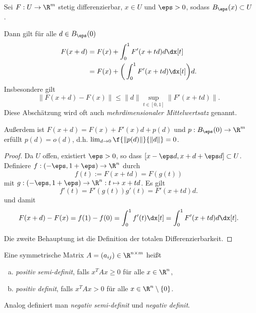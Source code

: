 \documentclass{mycourse}
\begin{document}
\begin{lem} \label{2.4}
	Sei $F: U \to \R^m$ stetig differenzierbar, $x\in U$ und $\eps > 0$, sodass $B_\eps(x) \subset U$.

	Dann gilt für alle $d \in B_\eps(0)$
	\begin{align*}
		F(x+d)
		&= F(x) + \int_0^1 F'(x+td) d \dx[t] \\
		&= F(x) + \bigg( \int_0^1 F'(x+td) \dx[t] \bigg) d.
	\end{align*}
	Insbesondere gilt
	\[
		\| F(x+d) - F(x) \|
		\le \|d\| \sup_{t\in [0,1]} \|F'(x+td)\|.
	\]
	Diese Abschätzung wird oft auch \emph{mehrdimensionaler Mittelwertsatz} genannt.

	Außerdem ist $F(x+d) = F(x) + F'(x)d + p(d)$ und $p: B_\eps(0) \to \R^m$ erfüllt $p(d) = o(d)$, d.h.
	$\lim_{d\to 0} \f {\|p(d)\|}{\|d\|} = 0$.

	\begin{proof}
		Da $U$ offen, existiert $\eps > 0$, so dass $[x- \eps d, x + d + \eps d] \subset U$.
		Definiere $f: (-\eps, 1 + \eps) \to \R^n$ durch
		\[
			f(t) := F(x + td) = F(g(t))
		\]
		mit $g:(-\eps, 1 + \eps) \to \R^n : t \mapsto x + td$.
		Es gilt
		\[
			f'(t)
			= F'(g(t)) g'(t)
			= F'(x + td) d.
		\]
		und damit
		\[
			F(x+d) - F(x)
			= f(1) - f(0)
			= \int_0^1 f'(t) \dx[t]
			= \int_0^1 F'(x + td) d \dx[t].
		\]

		Die zweite Behauptung ist die Definition der totalen Differenzierbarkeit.
	\end{proof}
\end{lem}

\begin{df} \label{2.5}
	Eine symmetrische Matrix $A = (a_{ij}) \in \R^{n\times m}$ heißt
	\begin{enumerate}[(a)]
		\item
			\emph{positiv semi-definit}, falls $x^TAx \ge 0$ für alle $x \in \R^n$,
		\item
			\emph{positiv definit}, falls $x^TAx > 0$ für alle $x \in \R^n \setminus \{0\}$.
	\end{enumerate}
	Analog definiert man \emph{negativ semi-definit} und \emph{negativ definit}.
\end{df}
\end{document}
